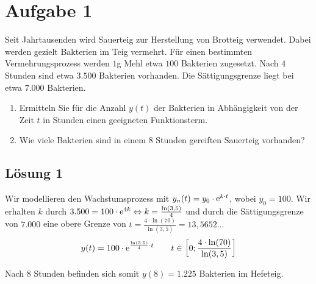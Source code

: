 \documentclass[main.tex]{subfiles}
\begin{document}
\section{Aufgabe 1}
Seit Jahrtausenden wird Sauerteig zur Herstellung von Brotteig verwendet. Dabei werden gezielt Bakterien im Teig vermehrt. Für einen bestimmten Vermehrungsprozess werden $1$g Mehl etwa $100$ Bakterien zugesetzt. Nach $4$ Stunden sind etwa $3.500$ Bakterien vorhanden. Die Sättigungsgrenze liegt bei etwa $7.000$ Bakterien.
\begin{enumerate}
    \item Ermitteln Sie für die Anzahl $y(t)$ der Bakterien in Abhängigkeit von der Zeit $t$ in Stunden einen geeigneten Funktionsterm.
    \item Wie viele Bakterien sind in einem $8$ Stunden gereiften Sauerteig vorhanden?
\end{enumerate}

\subsection{Lösung 1}

Wir modellieren den Wachstumsprozess mit $y_n(t) = y_0 \cdot \mathrm{e}^{k\cdot t}$, wobei $y_0 = 100$. Wir erhalten $k$ durch $3.500 = 100\cdot \mathrm{e}^{4k} \Leftrightarrow k = \frac{\ln(3,5)}{4}$ und durch die Sättigungsgrenze von $7.000$ eine obere Grenze von $t = \frac{4\cdot\ln(70)}{\ln(3,5)} = 13,5652\dots$
$$
    y(t) = 100 \cdot \mathrm{e}^{\frac{\ln(3,5)}{4} \cdot t}\qquad t\in \left[ 0; \frac{4\cdot\ln(70)}{\ln(3,5)}\right]
$$

Nach 8 Stunden befinden sich somit $y(8) = 1.225$ Bakterien im Hefeteig.
\end{document}

